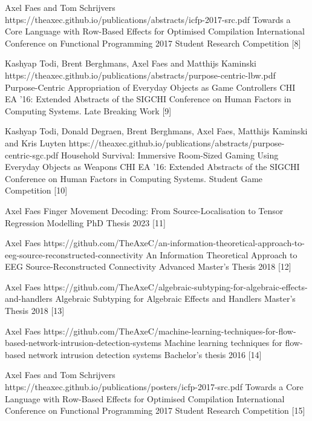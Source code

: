 \begin{cvpapers}
\cvpaper 
{Axel Faes and Tom Schrijvers}
{https://theaxec.github.io/publications/abstracts/icfp-2017-src.pdf}
{Towards a Core Language with Row-Based Effects for Optimised Compilation}
{International Conference on Functional Programming 2017 Student Research Competition}
{[8]}

\cvpaper 
{Kashyap Todi, Brent Berghmans, Axel Faes and Matthijs Kaminski}
{https://theaxec.github.io/publications/abstracts/purpose-centric-lbw.pdf}
{Purpose-Centric Appropriation of Everyday Objects as Game Controllers}
{CHI EA '16: Extended Abstracts of the SIGCHI Conference on Human Factors in Computing Systems. Late Breaking Work}
{[9]}

\cvpaper 
{Kashyap Todi, Donald Degraen, Brent Berghmans, Axel Faes, Matthijs Kaminski and Kris Luyten}
{https://theaxec.github.io/publications/abstracts/purpose-centric-sgc.pdf}
{Household Survival: Immersive Room-Sized Gaming Using Everyday Objects as Weapons}
{CHI EA '16: Extended Abstracts of the SIGCHI Conference on Human Factors in Computing Systems. Student Game Competition}
{[10]}


\end{cvpapers}\begin{cvpapers}
\cvpaper 
{Axel Faes}
{}
{Finger Movement Decoding: From Source-Localisation to Tensor Regression Modelling}
{PhD Thesis 2023}
{[11]}

\cvpaper 
{Axel Faes}
{https://github.com/TheAxeC/an-information-theoretical-approach-to-eeg-source-reconstructed-connectivity}
{An Information Theoretical Approach to EEG Source-Reconstructed Connectivity}
{Advanced Master's Thesis 2018}
{[12]}

\cvpaper 
{Axel Faes}
{https://github.com/TheAxeC/algebraic-subtyping-for-algebraic-effects-and-handlers}
{Algebraic Subtyping for Algebraic Effects and Handlers}
{Master's Thesis 2018}
{[13]}

\cvpaper 
{Axel Faes}
{https://github.com/TheAxeC/machine-learning-techniques-for-flow-based-network-intrusion-detection-systems}
{Machine learning techniques for flow-based network intrusion detection systems}
{Bachelor's thesis 2016}
{[14]}


\end{cvpapers}\begin{cvpapers}
\cvpaper 
{Axel Faes and Tom Schrijvers}
{https://theaxec.github.io/publications/posters/icfp-2017-src.pdf}
{Towards a Core Language with Row-Based Effects for Optimised Compilation}
{International Conference on Functional Programming 2017 Student Research Competition}
{[15]}



\end{cvpapers}

